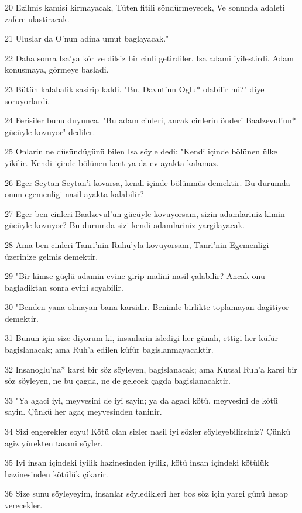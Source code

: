 \par 20 Ezilmis kamisi kirmayacak, Tüten fitili söndürmeyecek, Ve sonunda adaleti zafere ulastiracak.
\par 21 Uluslar da O'nun adina umut baglayacak."
\par 22 Daha sonra Isa'ya kör ve dilsiz bir cinli getirdiler. Isa adami iyilestirdi. Adam konusmaya, görmeye basladi.
\par 23 Bütün kalabalik sasirip kaldi. "Bu, Davut'un Oglu* olabilir mi?" diye soruyorlardi.
\par 24 Ferisiler bunu duyunca, "Bu adam cinleri, ancak cinlerin önderi Baalzevul'un* gücüyle kovuyor" dediler.
\par 25 Onlarin ne düsündügünü bilen Isa söyle dedi: "Kendi içinde bölünen ülke yikilir. Kendi içinde bölünen kent ya da ev ayakta kalamaz.
\par 26 Eger Seytan Seytan'i kovarsa, kendi içinde bölünmüs demektir. Bu durumda onun egemenligi nasil ayakta kalabilir?
\par 27 Eger ben cinleri Baalzevul'un gücüyle kovuyorsam, sizin adamlariniz kimin gücüyle kovuyor? Bu durumda sizi kendi adamlariniz yargilayacak.
\par 28 Ama ben cinleri Tanri'nin Ruhu'yla kovuyorsam, Tanri'nin Egemenligi üzerinize gelmis demektir.
\par 29 "Bir kimse güçlü adamin evine girip malini nasil çalabilir? Ancak onu bagladiktan sonra evini soyabilir.
\par 30 "Benden yana olmayan bana karsidir. Benimle birlikte toplamayan dagitiyor demektir.
\par 31 Bunun için size diyorum ki, insanlarin isledigi her günah, ettigi her küfür bagislanacak; ama Ruh'a edilen küfür bagislanmayacaktir.
\par 32 Insanoglu'na* karsi bir söz söyleyen, bagislanacak; ama Kutsal Ruh'a karsi bir söz söyleyen, ne bu çagda, ne de gelecek çagda bagislanacaktir.
\par 33 "Ya agaci iyi, meyvesini de iyi sayin; ya da agaci kötü, meyvesini de kötü sayin. Çünkü her agaç meyvesinden taninir.
\par 34 Sizi engerekler soyu! Kötü olan sizler nasil iyi sözler söyleyebilirsiniz? Çünkü agiz yürekten tasani söyler.
\par 35 Iyi insan içindeki iyilik hazinesinden iyilik, kötü insan içindeki kötülük hazinesinden kötülük çikarir.
\par 36 Size sunu söyleyeyim, insanlar söyledikleri her bos söz için yargi günü hesap verecekler.

